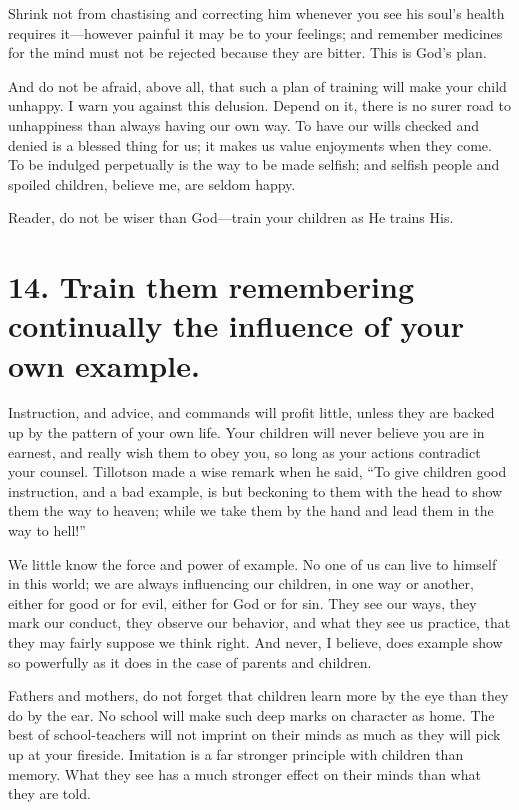 \documentclass[
]{book}
\begin{document}
Shrink not from chastising and correcting him whenever you see his soul's health requires it---however painful it may be to your feelings; and remember medicines for the mind must not be rejected because they are bitter. This is God's plan.

And do not be afraid, above all, that such a plan of training will make your child unhappy. I warn you against this delusion. Depend on it, there is no surer road to unhappiness than always having our own way. To have our wills checked and denied is a blessed thing for us; it makes us value enjoyments when they come. To be indulged perpetually is the way to be made selfish; and selfish people and spoiled children, believe me, are seldom happy.

Reader, do not be wiser than God---train your children as He trains His.

\hypertarget{train-them-remembering-continually-the-influence-of-your-own-example.}{%
\section*{14. Train them remembering continually the influence of your own example.}\label{train-them-remembering-continually-the-influence-of-your-own-example.}}

Instruction, and advice, and commands will profit little, unless they are backed up by the pattern of your own life. Your children will never believe you are in earnest, and really wish them to obey you, so long as your actions contradict your counsel. Tillotson made a wise remark when he said, ``To give children good instruction, and a bad example, is but beckoning to them with the head to show them the way to heaven; while we take them by the hand and lead them in the way to hell!''

We little know the force and power of example. No one of us can live to himself in this world; we are always influencing our children, in one way or another, either for good or for evil, either for God or for sin. They see our ways, they mark our conduct, they observe our behavior, and what they see us practice, that they may fairly suppose we think right. And never, I believe, does example show so powerfully as it does in the case of parents and children.

Fathers and mothers, do not forget that children learn more by the eye than they do by the ear. No school will make such deep marks on character as home. The best of school-teachers will not imprint on their minds as much as they will pick up at your fireside. Imitation is a far stronger principle with children than memory. What they see has a much stronger effect on their minds than what they are told.
\end{document}
